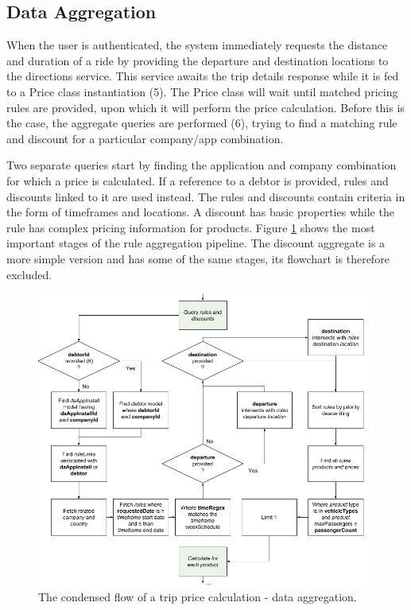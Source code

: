 \subsection{Data Aggregation}
When the user is authenticated, the system immediately requests the distance and duration of a ride by providing the departure and destination locations to the directions service. This service awaits the trip details response while it is fed to a Price class instantiation (5). The Price class will wait until matched pricing rules are provided, upon which it will perform the price calculation. Before this is the case, the aggregate queries are performed (6), trying to find a matching rule and discount for a particular company/app combination.

Two separate queries start by finding the application and company combination for which a price is calculated. If a reference to a debtor is provided, rules and discounts linked to it are used instead. The rules and discounts contain criteria in the form of timeframes and locations. A discount has basic properties while the rule has complex pricing information for products. Figure \ref{fig:Data Aggregation} shows the most important stages of the rule aggregation pipeline. The discount aggregate is a more simple version and has some of the same stages, its flowchart is therefore excluded.

\begin{figure}[H]
	\centering
	\includegraphics[width=1\textwidth]{DataAggregation}
	\caption[Data Aggregation]{The condensed flow of a trip price calculation - data aggregation.}
	\label{fig:Data Aggregation}
\end{figure}

